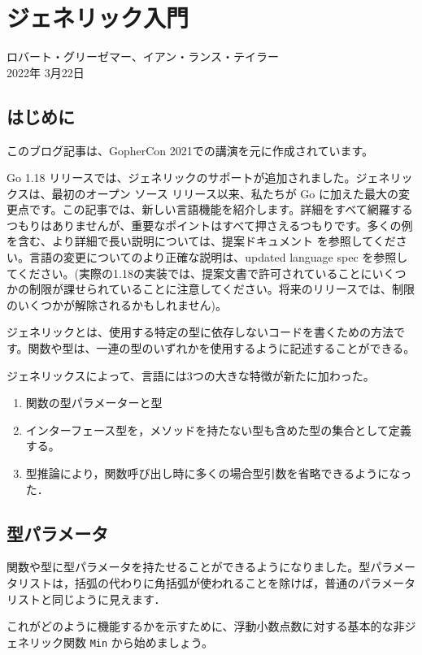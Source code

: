 \section{ジェネリック入門}

ロバート・グリーゼマー、イアン・ランス・テイラー\\
2022年 3月22日

\subsection{はじめに}

このブログ記事は、GopherCon 2021での講演を元に作成されています。

Go 1.18 リリースでは、ジェネリックのサポートが追加されました。ジェネリックスは、最初のオープン
ソース リリース以来、私たちが Go
に加えた最大の変更点です。この記事では、新しい言語機能を紹介します。詳細をすべて網羅するつもりはありませんが、重要なポイントはすべて押さえるつもりです。多くの例を含む、より詳細で長い説明については、提案ドキュメント
を参照してください。言語の変更についてのより正確な説明は、updated language spec を参照してください。(実際の1.18の実装では、提案文書で許可されていることにいくつかの制限が課せられていることに注意してください。将来のリリースでは、制限のいくつかが解除されるかもしれません)。

ジェネリックとは、使用する特定の型に依存しないコードを書くための方法です。関数や型は、一連の型のいずれかを使用するように記述することができる。

ジェネリックスによって、言語には3つの大きな特徴が新たに加わった。

\begin{enumerate}
\item
  関数の型パラメーターと型
\item
  インターフェース型を，メソッドを持たない型も含めた型の集合として定義する。
\item
  型推論により，関数呼び出し時に多くの場合型引数を省略できるようになった．
\end{enumerate}

\subsection{型パラメータ}

関数や型に型パラメータを持たせることができるようになりました。型パラメータリストは，括弧の代わりに角括弧が使われることを除けば，普通のパラメータリストと同じように見えます．

これがどのように機能するかを示すために、浮動小数点数に対する基本的な非ジェネリック関数
\texttt{Min} から始めましょう。

